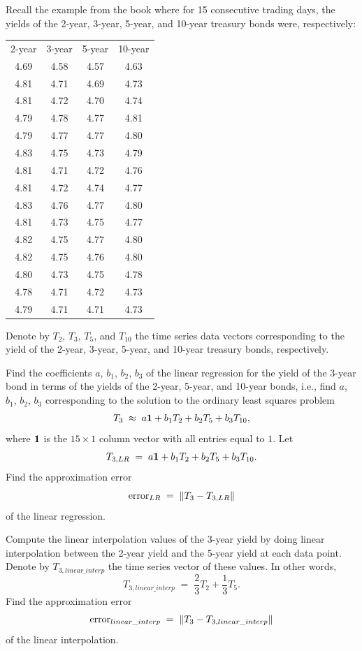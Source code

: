 \begin{exercises}
\item Recall the example from the book where for 15 consecutive trading days, the
yields of the 2-year, 3-year, 5-year, and 10-year treasury bonds were, respectively:
\begin{center}
\begin{tabular}{cccc}
2-year & 3-year & 5-year & 10-year \\[0.4em]
4.69 & 4.58 & 4.57 & 4.63 \\
4.81 & 4.71 & 4.69 & 4.73 \\
4.81 & 4.72 & 4.70 & 4.74 \\
4.79 & 4.78 & 4.77 & 4.81 \\
4.79 & 4.77 & 4.77 & 4.80 \\
4.83 & 4.75 & 4.73 & 4.79 \\
4.81 & 4.71 & 4.72 & 4.76 \\
4.81 & 4.72 & 4.74 & 4.77 \\
4.83 & 4.76 & 4.77 & 4.80 \\
4.81 & 4.73 & 4.75 & 4.77 \\
4.82 & 4.75 & 4.77 & 4.80 \\
4.82 & 4.75 & 4.76 & 4.80 \\
4.80 & 4.73 & 4.75 & 4.78 \\
4.78 & 4.71 & 4.72 & 4.73 \\
4.79 & 4.71 & 4.71 & 4.73
\end{tabular}
\end{center}

Denote by $T_2$, $T_3$, $T_5$, and $T_{10}$ the time series data vectors corresponding
to the yield of the 2-year, 3-year, 5-year, and 10-year treasury bonds, respectively.

\begin{subparts}
\item Find the coefficients $a$, $b_1$, $b_2$, $b_3$ of the linear regression for the
yield of the 3-year bond in terms of the yields of the 2-year, 5-year, and 10-year
bonds, i.e., find $a$, $b_1$, $b_2$, $b_3$ corresponding to the solution to the
ordinary least squares problem
\[
T_3 \;\approx\; a\mathbf{1} + b_1T_2 + b_2T_5 + b_3T_{10},
\]
where $\mathbf{1}$ is the $15\times1$ column vector with all entries equal to $1$. Let
\[
T_{3,LR} \;=\; a\mathbf{1} + b_1T_2 + b_2T_5 + b_3T_{10}.
\]
Find the approximation error
\[
\text{error}_{LR} \;=\; \left\|T_3 - T_{3,LR}\right\|
\]
of the linear regression.

\item Compute the linear interpolation values of the 3-year yield by doing linear
interpolation between the 2-year yield and the 5-year yield at each data point. Denote
by $T_{3,linear\_interp}$ the time series vector of these values. In other words,
\[
T_{3,linear\_interp} \;=\; \frac23T_2 + \frac13T_5.
\]
Find the approximation error
\[
\text{error}_{linear\_interp} \;=\; \left\|T_3 - T_{3,linear\_interp}\right\|
\]
of the linear interpolation.


\end{subparts}
\end{exercises}
